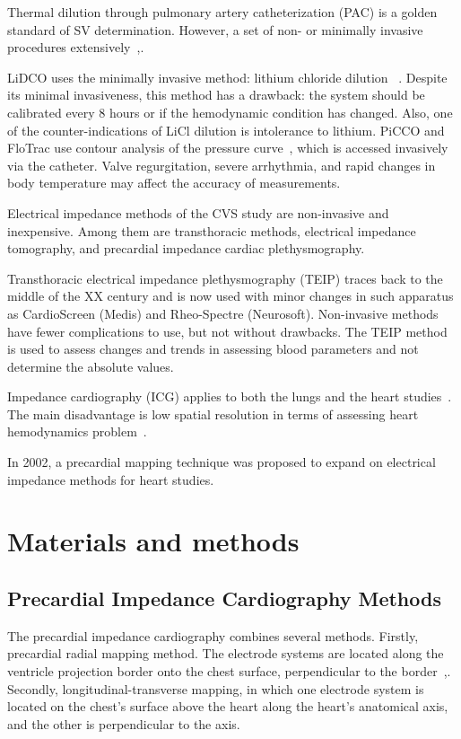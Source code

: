 \documentclass[conference]{IEEEtran}
\begin{document}
Thermal dilution through pulmonary artery catheterization (PAC) is a golden
standard of SV determination. However, a set of non- or minimally invasive
procedures extensively~\cite{Kobe2019},\cite{Mehta2014}.

LiDCO uses the minimally invasive method: lithium chloride dilution~\cite{Linton1993} .
Despite its minimal invasiveness, this method has a drawback: the
system should be calibrated every 8 hours or if the hemodynamic condition has
changed. Also, one of the counter-indications of LiCl dilution is intolerance to
lithium. PiCCO and FloTrac use contour analysis of the pressure curve~\cite{Horster2012}, which is
accessed invasively via the catheter. Valve regurgitation, severe arrhythmia,
and rapid changes in body temperature may affect the accuracy of measurements.


Electrical impedance methods of the CVS study are non-invasive and inexpensive.
Among them are transthoracic methods, electrical impedance tomography, and
precardial impedance cardiac plethysmography.

Transthoracic electrical impedance plethysmography (TEIP) traces back to the
middle of the XX century and is now used with minor changes in such apparatus as
CardioScreen (Medis) and Rheo-Spectre (Neurosoft). Non-invasive methods have
fewer complications to use, but not without drawbacks. The TEIP method is used
to assess changes and trends in assessing blood parameters and not determine the
absolute values.

Impedance cardiography (ICG) applies to both the lungs and the heart studies~\cite{Brown2003, Wu2018}.
The main disadvantage is low spatial resolution in terms of assessing heart
hemodynamics problem~\cite{Kircher2019, Rymarczyk2019}.

In 2002, a precardial mapping technique was proposed to expand on electrical
impedance methods for heart studies.

\section{Materials and methods}

\subsection{Precardial Impedance Cardiography Methods}

The precardial impedance cardiography combines several methods. Firstly,
precardial radial mapping method. The electrode systems are located along the
ventricle projection border onto the chest surface, perpendicular to the border~\cite{Timokhin2014},\cite{Tikhomirov2019}.
Secondly, longitudinal-transverse mapping, in which one electrode system is
located on the chest's surface above the heart along the heart's anatomical
axis, and the other is perpendicular to the axis.
\end{document}

